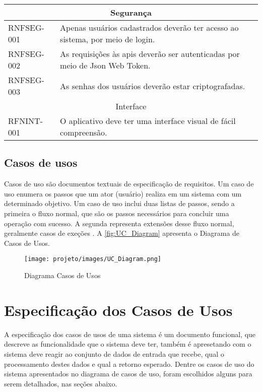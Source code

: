 \documentclass[12pt]{article}
\begin{document}
\begin{center}
\begin{tabular}{| p{} | p{} |}
  \hline
  \multicolumn{2}{|c|}{\cellcolor{gray!30}Segurança} \\
  \hline
  RNFSEG-001 & Apenas usuários cadastrados deverão ter acesso ao sistema, 
  por meio de login. \\
  \hline
  RNFSEG-002 & As requisições às apis deverão ser autenticadas por meio de Json Web Token. \\
  \hline
  RNFSEG-003 & As senhas dos usuários deverão estar criptografadas. \\
  \hline
  \multicolumn{2}{|c|}{\cellcolor{gray!30}Interface} \\
  \hline
  RFNINT-001 & O aplicativo deve ter uma interface visual de fácil compreensão. \\
  \hline
\end{tabular}
\end{center}

\subsection{Casos de usos}
Casos de uso são documentos textuais de especificação de requisitos. Um caso de uso enumera os passos que um ator (usuário) realiza em um sistema com um determinado objetivo. Um caso de uso inclui duas listas de passos, sendo a primeira o fluxo normal, que são os passos necessários para concluir uma operação com sucesso. A segunda representa extensões desse fluxo normal, geralmente casos de exeções \cite[Capítulo 3.1]{engsoftware}. A \autoref{fig:UC_Diagram} apresenta o Diagrama de Casos de Usos.

\begin{figure}[!ht]
  \centering
  \texttt{[image: projeto/images/UC\_Diagram.png]}
  \caption{Diagrama Casos de Usos}
  \label{fig:UC_Diagram}
\end{figure}

\section{Especificação dos Casos de Usos}
\label{sec:usecase_espec}
A especificação dos casos de usos de uma sistema é um documento funcional, que descreve as funcionalidade que o sistema deve ter, também é apresetando com o sistema deve reagir ao conjunto de dados de entrada que recebe, qual o processamento destes dados e qual a retorno esperado. Dentre os casos de uso do sistema apresentados no diagrama de casos de uso, foram escolhidos alguns para serem detalhados, nas seções abaixo.
\end{document}
